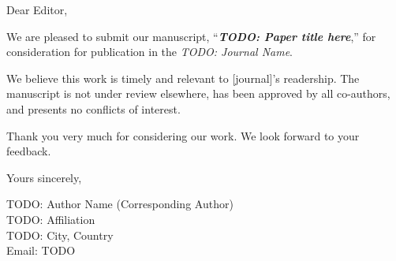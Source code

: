\documentclass[12pt]{article}
\begin{document}
Dear Editor,

We are pleased to submit our manuscript, ``\textbf{\textit{TODO: Paper title here}},'' for consideration for publication in the \textit{TODO: Journal Name}.


We believe this work is timely and relevant to [journal]'s readership. The manuscript is not under review elsewhere, has been approved by all co-authors, and presents no conflicts of interest.

Thank you very much for considering our work. We look forward to your feedback.

Yours sincerely,

TODO: Author Name (Corresponding Author)\\
TODO: Affiliation\\
TODO: City, Country\\
Email: TODO
\end{document}
